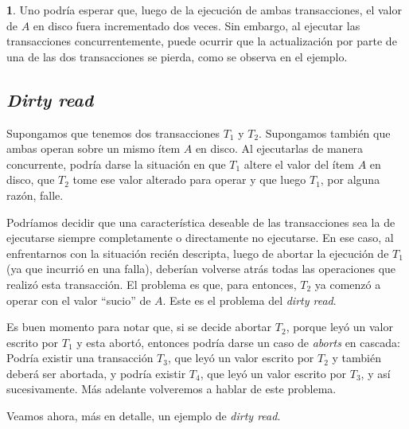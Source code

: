 \documentclass[english]{article}
\theoremstyle{definition}
\theoremstyle{definition}
\newtheorem{example}[thm]{\protect\examplename}
\providecommand{\examplename}{Ejemplo}
\begin{document}
\begin{example}
Uno podría esperar que, luego de la ejecución de ambas transacciones, el valor
de $A$ en disco fuera incrementado dos veces. Sin embargo, al ejecutar las
transacciones concurrentemente, puede ocurrir que la actualización por parte
de una de las dos transacciones se pierda, como se observa en el ejemplo.
\end{example}

\subsection{\emph{Dirty read}}

Supongamos que tenemos dos transacciones $T_1$ y $T_2$. Supongamos también que
ambas operan sobre un mismo ítem $A$ en disco. Al ejecutarlas de manera
concurrente, podría darse la situación en que $T_1$ altere el valor del ítem
$A$ en disco, que $T_2$ tome ese valor alterado para operar y que luego $T_1$,
por alguna razón, falle.

Podríamos decidir que una característica deseable de las transacciones sea la
de ejecutarse siempre completamente o directamente no ejecutarse. En ese caso,
al enfrentarnos con la situación recién descripta, luego de abortar la
ejecución de $T_1$ (ya que incurrió en una falla), deberían volverse atrás
todas las operaciones que realizó esta transacción. El problema es que, para
entonces, $T_2$ ya comenzó a operar con el valor ``sucio'' de $A$. Este es el
problema del \emph{dirty read}.

Es buen momento para notar que, si se decide abortar $T_2$, porque leyó un
valor escrito por $T_1$ y esta abortó, entonces podría darse un caso de
\emph{aborts} en cascada: Podría existir una transacción $T_3$, que leyó un
valor escrito por $T_2$ y también deberá ser abortada, y podría existir $T_4$,
que leyó un valor escrito por $T_3$, y así sucesivamente. Más adelante
volveremos a hablar de este problema.

Veamos ahora, más en detalle, un ejemplo de \emph{dirty read}.
\end{document}

